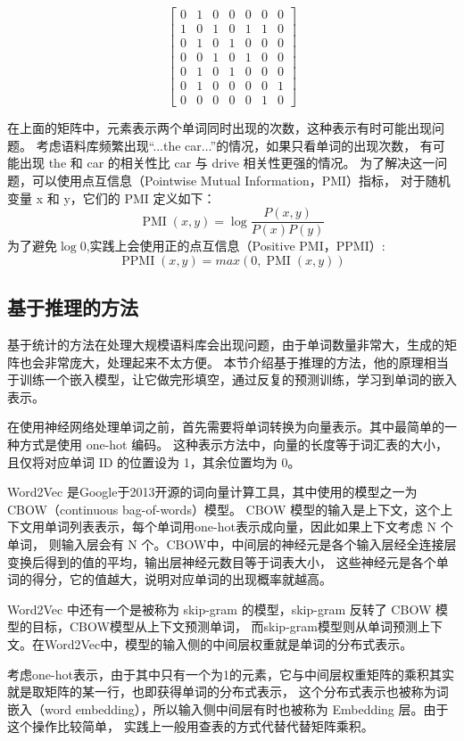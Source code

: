 $$
	\begin{bmatrix}
		0 & 1 & 0 & 0 & 0 & 0 & 0\\
		1 & 0 & 1 & 0 & 1 & 1 & 0\\
		0 & 1 & 0 & 1 & 0 & 0 & 0\\
		0 & 0 & 1 & 0 & 1 & 0 & 0\\
		0 & 1 & 0 & 1 & 0 & 0 & 0\\
		0 & 1 & 0 & 0 & 0 & 0 & 1\\
        0 & 0 & 0 & 0 & 0 & 1 & 0
	\end{bmatrix}
$$

在上面的矩阵中，元素表示两个单词同时出现的次数，这种表示有时可能出现问题。
考虑语料库频繁出现“...the car...”的情况，如果只看单词的出现次数，
有可能出现 the 和 car 的相关性比 car 与 drive 相关性更强的情况。
为了解决这一问题，可以使用点互信息（Pointwise Mutual Information，PMI）指标，
对于随机变量 x 和 y，它们的 PMI 定义如下：
$$
\operatorname{PMI}(x, y) = \log \frac{P(x, y)}{P(x) P(y)}
$$
为了避免$\log 0$,实践上会使用正的点互信息（Positive PMI，PPMI）:
$$
\operatorname{PPMI}(x, y) = max (0, \operatorname{PMI}(x, y))
$$

\subsection{基于推理的方法}
基于统计的方法在处理大规模语料库会出现问题，由于单词数量非常大，生成的矩阵也会非常庞大，处理起来不太方便。
本节介绍基于推理的方法，他的原理相当于训练一个嵌入模型，让它做完形填空，通过反复的预测训练，学习到单词的嵌入表示。

在使用神经网络处理单词之前，首先需要将单词转换为向量表示。其中最简单的一种方式是使用 one-hot 编码。
这种表示方法中，向量的长度等于词汇表的大小，且仅将对应单词 ID 的位置设为 1，其余位置均为 0。

Word2Vec 是Google于2013开源的词向量计算工具，其中使用的模型之一为 CBOW（continuous bag-of-words）模型。
CBOW 模型的输入是上下文，这个上下文用单词列表表示，每个单词用one-hot表示成向量，因此如果上下文考虑 N 个单词，
则输入层会有 N 个。CBOW中，中间层的神经元是各个输入层经全连接层变换后得到的值的平均，输出层神经元数目等于词表大小，
这些神经元是各个单词的得分，它的值越大，说明对应单词的出现概率就越高。

Word2Vec 中还有一个是被称为 skip-gram 的模型，skip-gram 反转了 CBOW 模型的目标，CBOW模型从上下文预测单词，
而skip-gram模型则从单词预测上下文。在Word2Vec中，模型的输入侧的中间层权重就是单词的分布式表示。

考虑one-hot表示，由于其中只有一个为1的元素，它与中间层权重矩阵的乘积其实就是取矩阵的某一行，也即获得单词的分布式表示，
这个分布式表示也被称为词嵌入（word embedding），所以输入侧中间层有时也被称为 Embedding 层。由于这个操作比较简单，
实践上一般用查表的方式代替代替矩阵乘积。